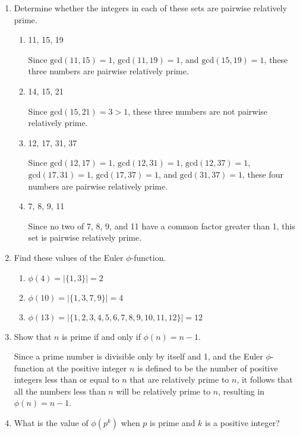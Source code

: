 \documentclass[11pt]{article}
\begin{document}
\begin{enumerate}[label=\textbf{\arabic*.}]
	\item Determine whether the integers in each of these sets are pairwise relatively prime.
	
	\begin{enumerate}[label=\textbf{\alph*)}]
		\item 11, 15, 19
		
		Since $\text{gcd}(11, 15) = 1$, $\text{gcd}(11, 19) = 1$, and $\text{gcd}(15, 19) = 1$, these three numbers are pairwise relatively prime.
		
		\item 14, 15, 21
		
		Since $\text{gcd}(15, 21) = 3 > 1$, these three numbers are not pairwise relatively prime.
		
		\item 12, 17, 31, 37
		
		Since $\text{gcd}(12, 17) = 1$, $\text{gcd}(12, 31) = 1$, $\text{gcd}(12, 37) = 1$, $\text{gcd}(17, 31) = 1$, $\text{gcd}(17, 37) = 1$, and $\text{gcd}(31, 37) = 1$, these four numbers are pairwise relatively prime.
		
		\item 7, 8, 9, 11
		
		Since no two of 7, 8, 9, and 11 have a common factor greater than 1, this set is pairwise relatively prime.
	\end{enumerate}
	
	\item Find these values of the Euler $\phi$-function.
	
	\begin{enumerate}[label=\textbf{\alph*)}]
		\item $\phi(4) = |\{1, 3\}| = 2$
		\item $\phi(10) = |\{1, 3, 7, 9\}| = 4$
		\item $\phi(13) = |\{1, 2, 3, 4, 5, 6, 7, 8, 9, 10, 11, 12\}| = 12$
	\end{enumerate}

	\item Show that $n$ is prime if and only if $\phi(n) = n - 1$.
	
	Since a prime number is divisible only by itself and 1, and the Euler $\phi$-function at the positive integer $n$ is defined to be the number of positive integers less than or equal to $n$ that are relatively prime to $n$, it follows that all the numbers less than $n$ will be relatively prime to $n$, resulting in $\phi(n) = n - 1$.

	\item What is the value of $\phi(p^k)$ when $p$ is prime and $k$ is a positive integer?
	

\end{enumerate}
\end{document}
